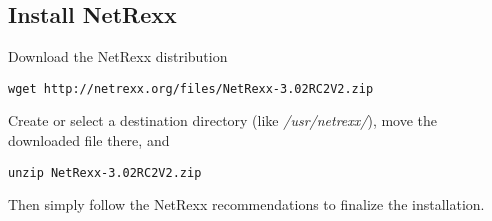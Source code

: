 \subsection{Install NetRexx}
Download the NetRexx distribution
\begin{verbatim}
wget http://netrexx.org/files/NetRexx-3.02RC2V2.zip
\end{verbatim}
Create or select a destination directory (like \emph{/usr/netrexx/}), move the downloaded file there, and
\begin{verbatim}
unzip NetRexx-3.02RC2V2.zip
\end{verbatim}
Then simply follow the NetRexx recommendations to finalize the installation.


